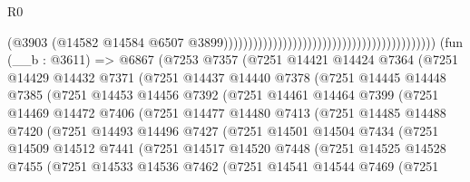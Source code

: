 \begin{lexlean}{R0}
\begin{coremodule}
                                                                                      (@3903
                                                                                        (@14582
                                                                                          @14584
                                                                                          @6507
                                                                                          @3899)))))))))))))))))))))))))))))))))))))))))))
    (fun (__b : @3611) =>
    @6867
      (@7253
        @7357
        (@7251
          @14421
          @14424
          @7364
          (@7251
            @14429
            @14432
            @7371
            (@7251
              @14437
              @14440
              @7378
              (@7251
                @14445
                @14448
                @7385
                (@7251
                  @14453
                  @14456
                  @7392
                  (@7251
                    @14461
                    @14464
                    @7399
                    (@7251
                      @14469
                      @14472
                      @7406
                      (@7251
                        @14477
                        @14480
                        @7413
                        (@7251
                          @14485
                          @14488
                          @7420
                          (@7251
                            @14493
                            @14496
                            @7427
                            (@7251
                              @14501
                              @14504
                              @7434
                              (@7251
                                @14509
                                @14512
                                @7441
                                (@7251
                                  @14517
                                  @14520
                                  @7448
                                  (@7251
                                    @14525
                                    @14528
                                    @7455
                                    (@7251
                                      @14533
                                      @14536
                                      @7462
                                      (@7251
                                        @14541
                                        @14544
                                        @7469
                                        (@7251

\end{coremodule}
\end{lexlean}
